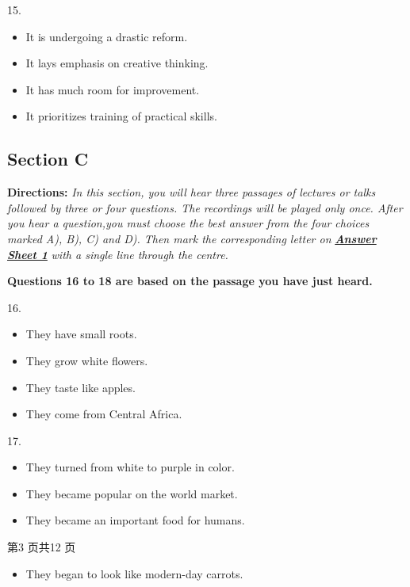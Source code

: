 \documentclass[UTF8,11pt]{ctexart}
\begin{document}
15.


\begin{itemize}[leftmargin=2em,itemsep=.2em,topsep=.4em]\item[A.] It is undergoing a drastic reform.
\item[B.] It lays emphasis on creative thinking.
\item[C.] It has much room for improvement.
\item[D.] It prioritizes training of practical skills.
\end{itemize}

\subsection*{\textbf{Section C}}


\textbf{Directions:}\textit{ In this section, you will hear three passages of lectures or talks followed by three or four} \textit{questions. The recordings will be played only once. After you hear a question,you must choose the best} \textit{answer from the four choices marked A), B), C) and D). Then mark the corresponding letter on}\textbf{\textit{ }}\textbf{\textit{\uline{Answer}}} \textbf{\textit{\uline{Sheet 1}}}\textit{ with a single line through the centre.}


\textbf{Questions 16 to 18 are based on the passage you have just heard.}


16.


\begin{itemize}[leftmargin=2em,itemsep=.2em,topsep=.4em]\item[A.] They have small roots.
\item[B.] They grow white flowers.
\item[C.] They taste like apples.
\item[D.] They come from Central Africa.
\end{itemize}

17.


\begin{itemize}[leftmargin=2em,itemsep=.2em,topsep=.4em]\item[A.] They turned from white to purple in color.
\item[B.] They became popular on the world market.
\item[C.] They became an important food for humans.
\end{itemize}

第3 页共12 页


\begin{itemize}[leftmargin=2em,itemsep=.2em,topsep=.4em]\item[D.] They began to look like modern-day carrots.
\end{itemize}
\end{document}
